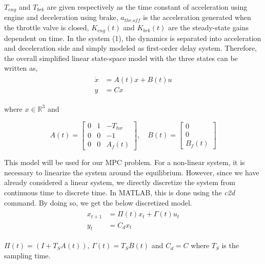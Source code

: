 $T_{eng}$ and $T_{brk}$ are given respectively as the time constant of acceleration using engine and deceleration using brake, $a_{thr.off}$ is the acceleration generated when the throttle valve is closed, $K_{eng}(t)$ and $K_{brk}(t)$ are the steady-state gains dependent on time. In the system (1), the dynamics is separated into acceleration and deceleration side and simply modeled as first-order delay system. Therefore, the overall simplified linear state-space model with the three states can be written as,
\begin{gather}
\begin{aligned}
\dot{x} &= A(t)x + B(t)u\\
y &= Cx
\end{aligned}
\end{gather}

where $x \in \mathbb{R}^3$ and

\[
A(t)=
    \begin{bmatrix}
    0 & 1 & -T_{hw}\\
    0 & 0 & -1\\
    0 & 0 & A_f(t)
    \end{bmatrix},
    \quad
B(t)=
\begin{bmatrix}
0\\
0\\
B_f(t)
\end{bmatrix}
\]

This model will be used for our MPC problem. For a non-linear system, it is necessary to linearize the system around the equilibrium. However, since we have already considered a linear system, we directly discretize the system from continuous time to discrete time. In MATLAB, this is done using the \textit{c2d} command. By doing so, we get the below discretized model.
\begin{gather}
\begin{aligned}
    x_{t+1} &= \Pi(t) x_t + \Gamma(t) u_t\\
    y_t &= C_d x_t
\end{aligned}
\end{gather}

$\Pi(t) = (I+T_S A(t)),\, \Gamma(t)=T_S B(t)$ and $C_d=C$ where $T_S$ is the sampling time.

    

